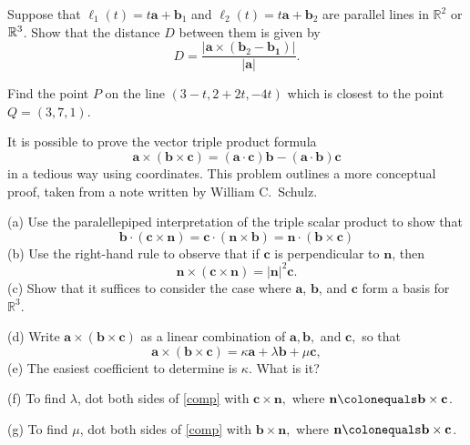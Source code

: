 \documentclass{watsonbook}
\begin{document}
\begin{aexercise}
  Suppose that $\ell_1(t)=t\mathbf{a}+\mathbf{b}_1$ and $\ell_2(t)=t\mathbf{a}+\mathbf{b}_2$ are parallel lines in $\mathbb{R}^2$ or $\mathbb{R}^3$. Show that the distance $D$ between them is given by 
\[
D = \frac{|\mathbf{a}\times(\mathbf{b}_2-\mathbf{b_1})|}{|\mathbf{a}|}. 
\]
\end{aexercise}

\begin{aexercise}
  Find the point $P$ on the line $(3-t,2+2t,-4t)$ which is closest to the point $Q=(3,7,1)$.
\end{aexercise}

\begin{aexercise}%
  It is possible to prove the vector triple product formula
  \[
    \mathbf{a}\times(\mathbf{b}\times\mathbf{c}) =
    (\mathbf{a}\cdot\mathbf{c})\mathbf{b} -
    (\mathbf{a}\cdot\mathbf{b})\mathbf{c}
  \]
  in a tedious way using coordinates. This problem outlines a more
  conceptual proof, taken from a note written by William C.\ Schulz.

  (a) Use the paralellepiped interpretation of the triple scalar
  product to show that
  \[
    \mathbf{b}\cdot(\mathbf{c}\times\mathbf{n}) =
    \mathbf{c}\cdot(\mathbf{n}\times\mathbf{b}) =
    \mathbf{n}\cdot(\mathbf{b}\times\mathbf{c})
  \]
  (b) Use the right-hand rule to observe that if $\mathbf{c}$ is
  perpendicular to $\mathbf{n}$, then
  \[
    \mathbf{n}\times(\mathbf{c}\times\mathbf{n}) =
    |\mathbf{n}|^2\mathbf{c}.
  \]
  (c) Show that it suffices to consider the case where $\mathbf{a}$,
  $\mathbf{b}$, and $\mathbf{c}$ form a basis for $\mathbb{R}^3$.

  (d) Write $\mathbf{a}\times(\mathbf{b}\times\mathbf{c})$ as a linear
  combination of $\mathbf{a}, \mathbf{b},$ and $\mathbf{c},$ so that
  \begin{equation} \label{comp}
    \mathbf{a}\times(\mathbf{b}\times\mathbf{c}) = \kappa
    \mathbf{a}+\lambda \mathbf{b}+\mu\mathbf{c},
  \end{equation} 
  (e) The easiest coefficient to determine is $\kappa$. What is it?

  (f) To find $\lambda$, dot both sides of \eqref{comp} with
  $\mathbf{c}\times \mathbf{n},$ where
  $\mathbf{n}\colonequals \mathbf{b}\times\mathbf{c}$.

  (g) To find $\mu$, dot both sides of \eqref{comp} with
  $\mathbf{b}\times \mathbf{n},$ where
  $\mathbf{n}\colonequals \mathbf{b}\times\mathbf{c}$.
\end{aexercise}
\end{document}
